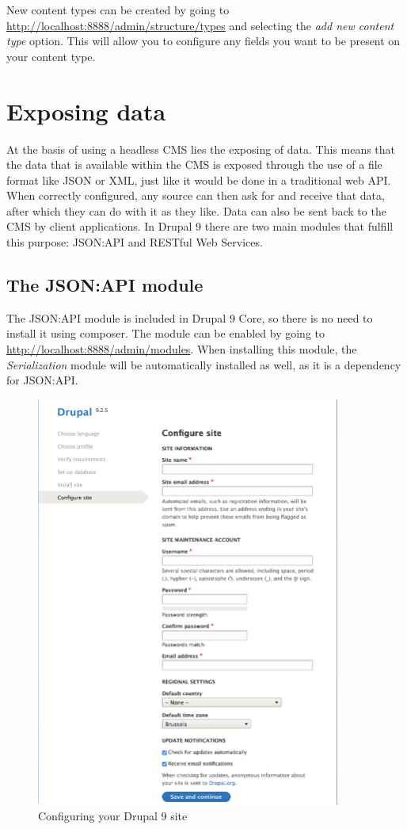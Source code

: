 New content types can be created by going to \url{http://localhost:8888/admin/structure/types} and selecting the \emph{add new content type} option. This will allow you to configure any fields you want to be present on your content type.


\section{Exposing data}

At the basis of using a headless CMS lies the exposing of data. This means that the data that is available within the CMS is exposed through the use of a file format like JSON or XML, just like it would be done in a traditional web API. When correctly configured, any source can then ask for and receive that data, after which they can do with it as they like. Data can also be sent back to the CMS by client applications. In Drupal 9 there are two main modules that fulfill this purpose: JSON:API and RESTful Web Services.

\subsection{The JSON:API module}

The JSON:API module is included in Drupal 9 Core, so there is no need to install it using composer. The module can be enabled by going to \url{http://localhost:8888/admin/modules}. When installing this module, the \emph{Serialization} module will be automatically installed as well, as it is a dependency for JSON:API.

\begin{figure}[h]
	\centering
	\includegraphics[width=10cm]{./img/Install_Config.png}
	\caption[Configuring Drupal 9]{Configuring your Drupal 9 site}
\end{figure}

